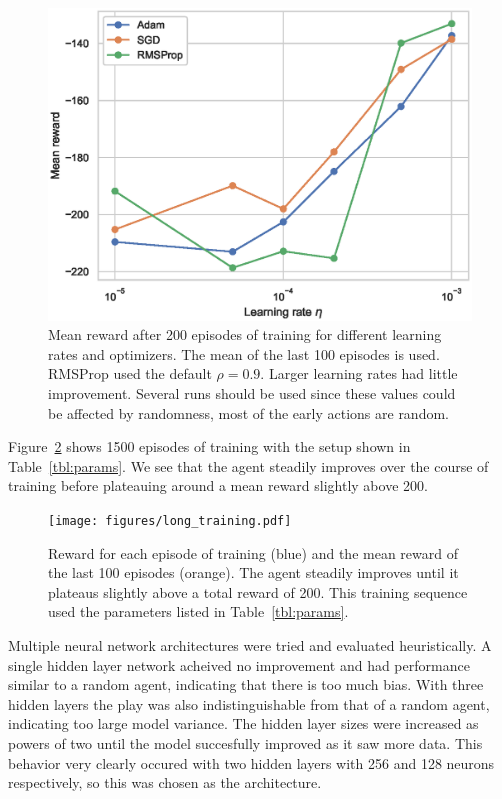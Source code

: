 \documentclass{article}
\begin{document}
\begin{figure}[tb]
  \includegraphics[width=\linewidth]{figures/learning_rate.eps}
  \caption{Mean reward after 200 episodes of training for different learning rates and optimizers. The mean of the last 100 episodes is used. RMSProp used the default $\rho = 0.9$. Larger learning rates had little improvement. Several runs should be used since these values could be affected by randomness, most of the early actions are random.}
  \label{fig:lr}
\end{figure}

Figure~\ref{fig:training} shows 1500 episodes of training with the setup shown in Table~\ref{tbl:params}. We see that the agent steadily improves over the course of training before plateauing around a mean reward slightly above 200.

\begin{figure}[tb]
  \centering
  \texttt{[image: figures/long\_training.pdf]}
  \caption{Reward for each episode of training (blue) and the mean reward of the last 100 episodes (orange). The agent steadily improves until it plateaus slightly above a total reward of 200. This training sequence used the parameters listed in Table~\ref{tbl:params}.}
  \label{fig:training}
\end{figure}

Multiple neural network architectures were tried and evaluated heuristically. A single hidden layer network acheived no improvement and had performance similar to a random agent, indicating that there is too much bias. With three hidden layers the play was also indistinguishable from that of a random agent, indicating too large model variance. The hidden layer sizes were increased as powers of two until the model succesfully improved as it saw more data. This behavior very clearly occured with two hidden layers with 256 and 128 neurons respectively, so this was chosen as the architecture.
\end{document}

